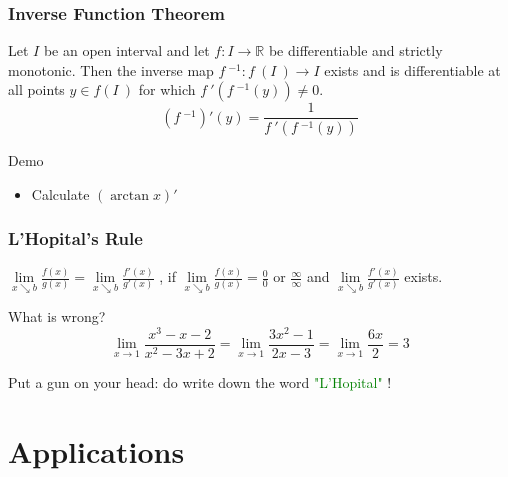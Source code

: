 \documentclass{beamer}
\begin{document}
\begin{frame}
    \frametitle{Inverse Function Theorem}
    \hspace{1em}
    Let $I$ be an open interval and let $f : I \to \mathbb{R}$ be
    differentiable and strictly monotonic. Then the inverse map
    $f~^{-1} : f~(I~) \to I$ exists and is differentiable at all points $y \in f (I~)$ for
    which $f~'(f~^{-1}(y)) \neq 0$. 
     \large{$$(f~^{-1})'(y)=\frac{1}{f~'(f~^{-1}(y))}$$}
    \begin{block}{Demo}
        \begin{itemize}
            \item Calculate $(\arctan x)'$
        \end{itemize}
    \end{block}
\end{frame}
\begin{frame}
    \frametitle{L'Hopital's Rule}
    \begin{center}
    \vspace{1em}
     \large{$\underset{x\searrow b}{\lim}\frac{f(x)}{g(x)}=\underset{x\searrow b}{\lim}\frac{f'(x)}{g'(x)}$
    , if $\underset{x\searrow b}{\lim}\frac{f(x)}{g(x)}=\frac{0}{0}\text{ or }\frac{\infty}{\infty}$ and $\underset{x\searrow b}{\lim}\frac{f'(x)}{g'(x)}$ exists.}
    \end{center}
    \vspace{2em}
    \begin{block}{What is wrong?}
        \begin{equation*}
            \underset{x\rightarrow 1}{\lim}\frac{x^3-x-2}{x^2-3x+2}=\underset{x\rightarrow 1}{\lim}\frac{3x^2-1}{2x-3}=\underset{x\rightarrow 1}{\lim}\frac{6x}{2}=3
        \end{equation*}
    \end{block}
    \vspace{1em}
    Put a gun on your head: do write down the word \textcolor{green}{"L'Hopital"} !
\end{frame}
\section{Applications}
\end{document}
